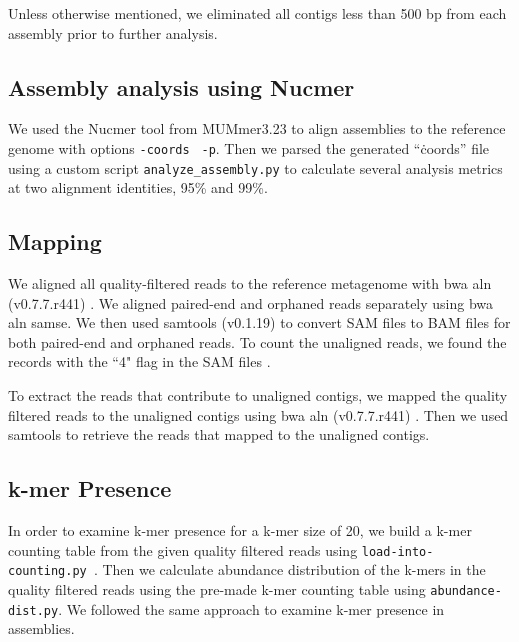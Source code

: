 \documentclass[10pt,a4paper,twocolumn]{article}
\begin{document}
Unless otherwise mentioned, we eliminated all contigs less than 500 bp
from each assembly prior to further analysis.

\subsection*{Assembly analysis using Nucmer}

We used the Nucmer tool from MUMmer3.23 \cite{mummer3.0} to align
assemblies to the reference genome with options {\tt \--coords} {\tt
  -p}. Then we parsed the generated ``\.coords'' file using a custom
script {\tt{analyze\_assembly.py}} to calculate several analysis
metrics at two alignment identities, 95\% and 99\%.

\subsection*{Mapping}

We aligned all quality-filtered reads to the reference metagenome with
bwa aln (v0.7.7.r441) \cite{bwa}. We aligned paired-end and orphaned
reads separately using bwa aln samse. We then used samtools (v0.1.19)
\cite{sam-stools} to convert SAM files to BAM files for both
paired-end and orphaned reads. To count the unaligned reads, we found
the records with the ``4" flag in the SAM files \cite{sam-stools}.
 

To extract the reads that contribute to unaligned contigs, we mapped
the quality filtered reads to the unaligned contigs using bwa aln
(v0.7.7.r441) \cite{bwa}.  Then we used samtools to retrieve the reads
that mapped to the unaligned contigs.





\subsection*{k-mer Presence}
In order to examine k-mer presence for a k-mer size of 20, we build a
k-mer counting table from the given quality filtered reads using
{\tt{load-into-counting.py} }. Then we calculate abundance
distribution of the k-mers in the quality filtered reads using the
pre-made k-mer counting table using {\tt{abundance-dist.py}}. We
followed the same approach to examine k-mer presence in assemblies.
\end{document}
